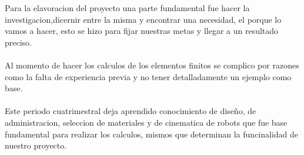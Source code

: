 \documentclass[12pt,letterpaper]{article}
\begin{document}
Para la elavoracion del proyecto una parte fundamental fue hacer la investigacion,dicernir entre la misma y encontrar una necesidad, el porque lo vamos a hacer, esto se hizo para fijar nuestras metas y llegar a un resultado preciso.
\\\\
Al momento de hacer los calculos de los elementos finitos se complico por razones como la falta de experiencia previa y no tener detalladamente un ejemplo como base.
\\\\
Este periodo cuatrimestral deja aprendido conocimiento de diseño, de administracion, seleccion de materiales y de cinematica de robots que fue base fundamental para realizar los calculos, mismos que determinan la funcinalidad de nuestro proyecto.
\end{document}
